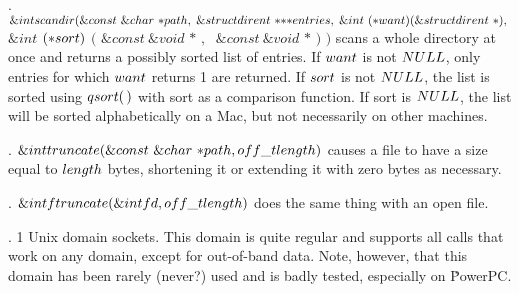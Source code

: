 . \CD{}$\&{int}\ \\{scandir}(\&{const}\ \&{char}\ {*}\\{path},\;\&{struct}\
\\{dirent}\ {*}{*}{*}\\{entries},\;\&{int}\ ({{*}}\\{want})(\&{struct}\ %
\\{dirent}\ {*}),\;$ $\&{int}$ $({{*}}\\{sort})$ $($ $\&{const}\ \&{void}$
${*}$ $,\;$ $\&{const}\ \&{void}$ ${*}$ $)$ $)$\DC{} scans a whole directory at
once and returns
a possibly sorted list of entries. If \CD{}$\\{want}$\DC{} is not \CD{}$%
\\{NULL}$\DC{}, only entries for which \CD{}$\\{want}$\DC{}
returns 1 are returned. If \CD{}$\\{sort}$\DC{} is not \CD{}$\\{NULL}$\DC{},
the list is sorted using \CD{}$\\{qsort}(\,)$\DC{} with
sort as a comparison function. If sort is \CD{}$\\{NULL}$\DC{}, the list will
be sorted alphabetically on
a Mac, but not necessarily on other machines.

\fi

. \CD{}$\&{int}\ \\{truncate}(\&{const}\ \&{char}\ {*}\\{path},\;\\{off\_t}%
\ \\{length})$\DC{} causes a file to have a size equal to \CD{}$\\{length}$%
\DC{}
bytes, shortening it or extending it with zero bytes as necessary.

\fi

. \CD{}$\&{int}\ \\{ftruncate}(\&{int}\ \\{fd},\;\\{off\_t}\ \\{length})$%
\DC{} does the same thing with an open file.

\fi

. 1 Unix domain sockets. This domain is quite regular and supports all
calls that
work on any domain, except for out-of-band data. Note, however, that this
domain
has been rarely (never?) used and is badly tested, especially on \.{PowerPC}.

\fi

